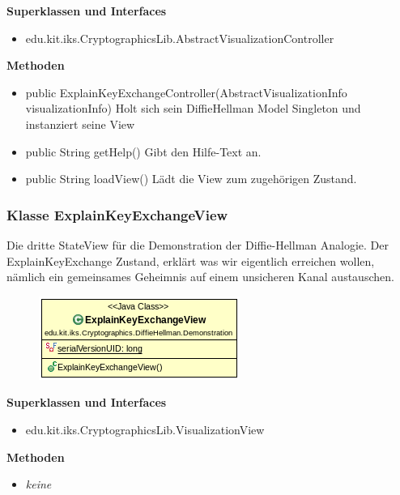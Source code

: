 \documentclass{article}
\begin{document}
      \textbf{Superklassen und Interfaces}
      \begin{itemize}
        \item edu.kit.iks.CryptographicsLib.AbstractVisualizationController
      \end{itemize}

      \textbf{Methoden}
      \begin{itemize}
          \item public ExplainKeyExchangeController(AbstractVisualizationInfo visualizationInfo) \newline
              Holt sich sein DiffieHellman Model Singleton und instanziert seine View
        \item public String getHelp() \newline
        Gibt den Hilfe-Text an.
        \item public String loadView() \newline
        Lädt die View zum zugehörigen Zustand.
      \end{itemize}

\subsubsection{Klasse ExplainKeyExchangeView}
      Die dritte StateView für die Demonstration der Diffie-Hellman Analogie.
      Der ExplainKeyExchange Zustand, erklärt was wir eigentlich erreichen wollen,
      nämlich ein gemeinsames Geheimnis auf einem unsicheren Kanal austauschen.

      \begin{figure}[H]
        \centering
        \includegraphics{resources/edu-kit-iks-Cryptographics-DiffieHellman-Demonstration-ExplainKeyExchangeView}
      \end{figure}

      \textbf{Superklassen und Interfaces}
      \begin{itemize}
        \item edu.kit.iks.CryptographicsLib.VisualizationView
      \end{itemize}

      \textbf{Methoden}
      \begin{itemize}
        \item \textit{keine}
      \end{itemize}
\end{document}
